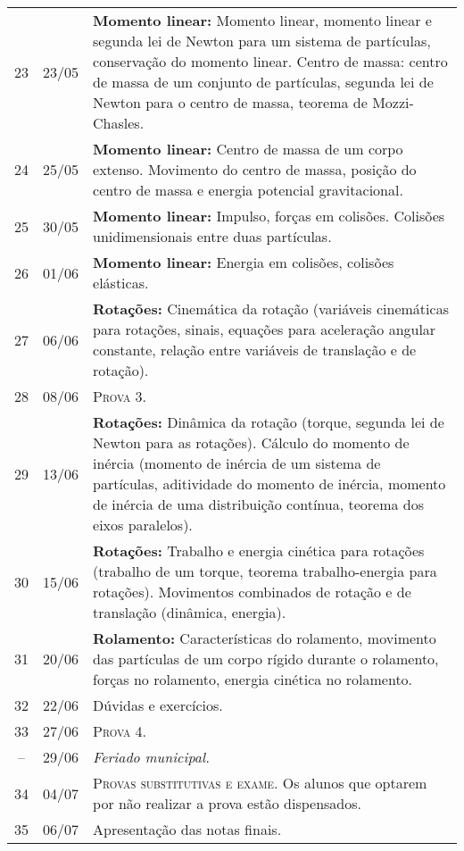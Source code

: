 \begin{center}
\begin{longtable}{ccp{70mm}}
23	 & 	23/05	 & 	\textbf{Momento linear:} Momento linear, momento linear e segunda lei de Newton para um sistema de partículas, conservação do momento linear. Centro de massa: centro de massa de um conjunto de partículas, segunda lei de Newton para o centro de massa, teorema de Mozzi-Chasles. \\
24	 & 	25/05	 & 	\textbf{Momento linear:} Centro de massa de um corpo extenso. Movimento do centro de massa, posição do centro de massa e energia potencial gravitacional. \\
25	 & 	30/05	 & 	\textbf{Momento linear:} Impulso, forças em colisões. Colisões unidimensionais entre duas partículas. \\
26	 & 	01/06	 & 	\textbf{Momento linear:} Energia em colisões, colisões elásticas. \\
27	 & 	06/06	 & 	\textbf{Rotações:} Cinemática da rotação (variáveis cinemáticas para rotações, sinais, equações para aceleração angular constante, relação entre variáveis de translação e de rotação). \\
28	 & 	08/06	 & 	\textsc{Prova 3}. \\
29	 & 	13/06	 & 	\textbf{Rotações:} Dinâmica da rotação (torque, segunda lei de Newton para as rotações). Cálculo do momento de inércia (momento de inércia de um sistema de partículas, aditividade do momento de inércia, momento de inércia de uma distribuição contínua, teorema dos eixos paralelos). \\
30	 & 	15/06	 & 	\textbf{Rotações:} Trabalho e energia cinética para rotações (trabalho de um torque, teorema trabalho-energia para rotações). Movimentos combinados de rotação e de translação (dinâmica, energia).\\
31	 & 	20/06	 & 	\textbf{Rolamento:} Características do rolamento, movimento das partículas de um corpo rígido durante o rolamento, forças no rolamento, energia cinética no rolamento. \\
32	 & 	22/06	 & 	Dúvidas e exercícios. \\
33	 & 	27/06	 & 	\textsc{Prova 4}. \\
--	 & 	29/06	 & 	\emph{Feriado municipal.} \\
34	 & 	04/07	 & 	\textsc{Provas substitutivas e exame}. Os alunos que optarem por não realizar a prova estão dispensados. \\
35	 & 	06/07	 & 	Apresentação das notas finais. \\
\end{longtable}
\end{center}

\cleardoublepage


